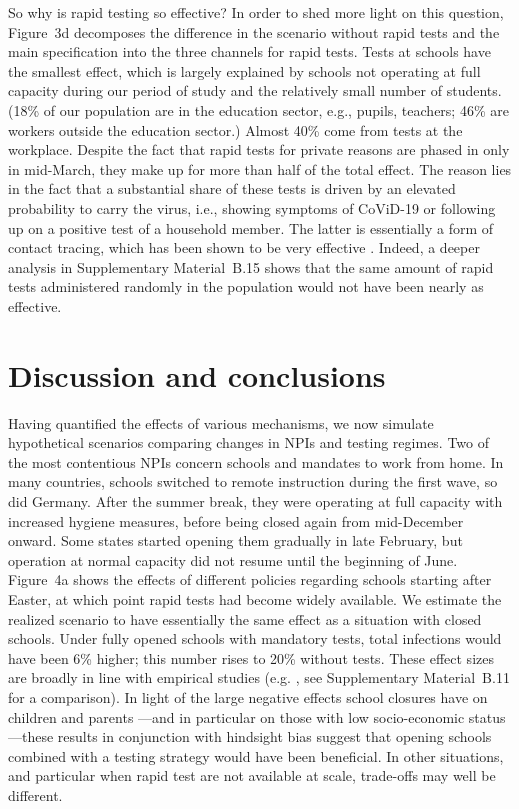 \documentclass[fleqn,10pt]{wlscirep}
\begin{document}
So why is rapid testing so effective? In order to shed more light on this question,
Figure~3d decomposes the difference in the scenario without rapid tests and the main
specification into the three channels for rapid tests. Tests at schools have the
smallest effect, which is largely explained by schools not operating at full capacity
during our period of study and the relatively small number of students. (18\% of our
population are in the education sector, e.g., pupils, teachers; 46\% are workers outside
the education sector.) Almost 40\% come from tests at the workplace. Despite the fact
that rapid tests for private reasons are phased in only in mid-March, they make up for
more than half of the total effect. The reason lies in the fact that a substantial share
of these tests is driven by an elevated probability to carry the virus, i.e., showing
symptoms of CoViD-19 or following up on a positive test of a household member. The
latter is essentially a form of contact tracing, which has been shown to be very
effective \cite{Contreras2021, Fetzer2021,Kretzschmar2020}. Indeed, a deeper analysis in
Supplementary Material~B.15 shows that the same amount of rapid tests administered
randomly in the population would not have been nearly as effective.

\section*{Discussion and conclusions}

Having quantified the effects of various mechanisms, we now simulate hypothetical
scenarios comparing changes in NPIs and testing regimes. Two of the most contentious
NPIs concern schools and mandates to work from home. In many countries, schools switched
to remote instruction during the first wave, so did Germany. After the summer break,
they were operating at full capacity with increased hygiene measures, before being
closed again from mid-December onward. Some states started opening them gradually in
late February, but operation at normal capacity did not resume until the beginning of
June. Figure~4a shows the effects of different policies regarding schools starting after
Easter, at which point rapid tests had become widely available. We estimate the realized
scenario to have essentially the same effect as a situation with closed schools. Under
fully opened schools with mandatory tests, total infections would have been 6\% higher;
this number rises to 20\% without tests. These effect sizes are broadly in line with
empirical studies (e.g. \cite{Vlachos2021, Berger2021}, see Supplementary Material~B.11
for a comparison). In light of the large negative effects school closures have on
children and parents \cite{Luijten2021, Melegari2021}---and in particular on those with
low socio-economic status---these results in conjunction with hindsight bias suggest
that opening schools combined with a testing strategy would have been beneficial. In
other situations, and particular when rapid test are not available at scale, trade-offs
may well be different.
\end{document}
